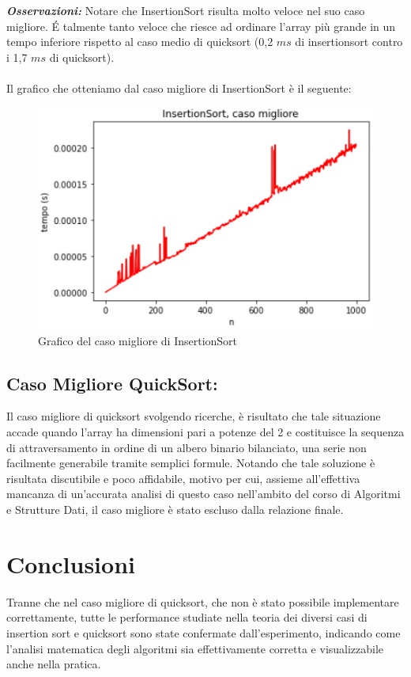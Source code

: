 \documentclass{article}
\begin{document}
\noindent \textit{\bf{Osservazioni:}}
\newline
Notare che InsertionSort risulta molto veloce nel suo caso migliore. É  talmente tanto veloce che riesce ad ordinare l'array più grande in un tempo inferiore rispetto al caso medio di quicksort (0,2 $ms$ di insertionsort contro i 1,7 $ms$ di quicksort). \\
\\
Il grafico che otteniamo dal caso migliore di InsertionSort è il seguente: \\

\begin{figure}[H]
\centering
\includegraphics[width=.7\textwidth, height=.6\textheight, keepaspectratio]{CasoMiglioreGrafico}
\vspace{-5mm}
\caption{Grafico del caso migliore di InsertionSort}
\label{fig:fig6}
\end{figure}


\subsection {Caso Migliore QuickSort:}
Il caso migliore di quicksort svolgendo ricerche, è risultato che tale situazione accade quando l'array ha dimensioni pari a potenze del 2 e costituisce la sequenza di attraversamento in ordine di un albero binario bilanciato, una serie non facilmente generabile tramite semplici formule. Notando che tale soluzione è risultata discutibile e poco affidabile, motivo per cui, assieme all'effettiva mancanza di un'accurata analisi di questo caso nell'ambito del corso di Algoritmi e Strutture Dati, il caso migliore è stato escluso dalla relazione finale. \\


\section {Conclusioni} 
Tranne che nel caso migliore di quicksort, che non è stato possibile implementare correttamente, tutte le performance studiate nella teoria dei diversi casi di insertion sort e quicksort sono state confermate dall'esperimento, indicando come l'analisi matematica degli algoritmi sia effettivamente corretta e visualizzabile anche nella pratica. 
\end{document}

